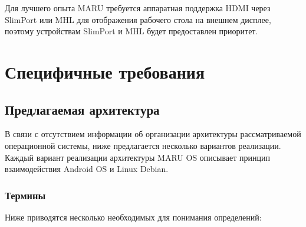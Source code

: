 \documentclass[a4paper, 14pt]{article}
\begin{document}
\par Для лучшего опыта MARU требуется аппаратная поддержка HDMI через SlimPort или MHL для отображения рабочего стола на внешнем дисплее, поэтому устройствам SlimPort и MHL будет предоставлен приоритет.

\section{Специфичные требования}

\subsection{Предлагаемая архитектура}

\par В связи с отсутствием информации об организации архитектуры рассматриваемой операционной системы, ниже предлагается несколько вариантов реализации. Каждый вариант реализации архитектуры MARU OS описывает принцип взаимодействия Android OS и Linux Debian.

\subsubsection{Термины}
\par Ниже приводятся несколько необходимых для понимания определений:
\end{document}
